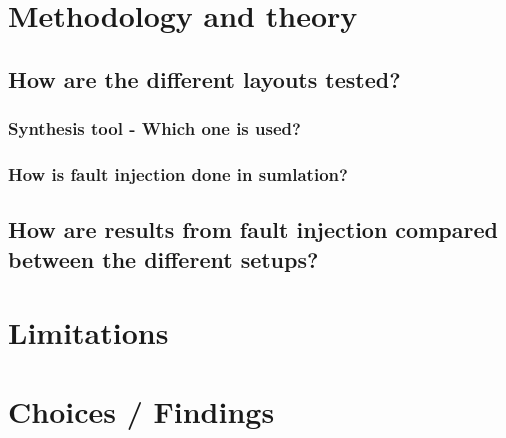 \section{Methodology and theory}
\label{sec:method}

\subsection{How are the different layouts tested?}
\subsubsection{Synthesis tool - Which one is used?}
\subsubsection{How is fault injection done in sumlation?}
\subsection{How are results from fault injection compared between the different setups?}

\section{Limitations}
\label{sec:limit}

\section{Choices / Findings}
\label{sec:choice}